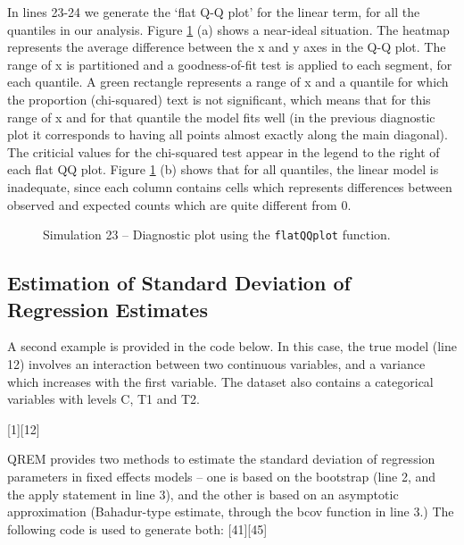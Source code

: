 \documentclass[a4paper,10pt]{article}
\begin{document}
In lines 23-24 we generate the `flat Q-Q plot' for the linear term, for all the quantiles in our analysis. Figure \ref{sim23flatqq} (a) shows a near-ideal situation. The heatmap represents the average difference between the x and y axes in the Q-Q plot. The range of x is partitioned and a goodness-of-fit test is applied to each segment, for each quantile. A green rectangle represents a range of x and a quantile for which the proportion (chi-squared) text is not significant, which means that for this range of x and for that quantile the model fits well (in the previous diagnostic plot it corresponds to having all points almost exactly along the main diagonal). The criticial values for the chi-squared test appear in the legend to the right of each flat QQ plot. Figure \ref{sim23flatqq} (b) shows that for all quantiles, the linear model is inadequate, since each column contains cells which represents differences between observed and expected counts which are quite different from 0.

\begin{figure}[t!]
\centering
{}
\caption{Simulation 23 -- Diagnostic plot using the \texttt{flatQQplot} function.}\label{sim23flatqq}
\end{figure}


\subsection{Estimation of Standard Deviation of Regression Estimates}

A second example is provided in the code below. In this case, the true model (line 12) involves an interaction between two continuous variables, and a variance which increases with the first variable. The dataset also contains a categorical variables with levels C, T1 and T2. 

[1][12]

QREM provides two methods to estimate the standard deviation of regression parameters in fixed effects models -- one is based on the bootstrap (line 2, and the apply statement in line 3), and the other is based on an asymptotic approximation (Bahadur-type estimate, through the bcov function in line 3.) The following code is used to generate both:
[41][45]
\end{document}
